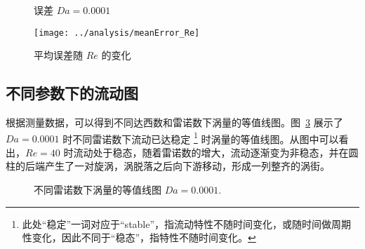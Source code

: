 \begin{figure}
	\centering
	\begin{minipage}{\textwidth}
		\centering
	\end{minipage}
	\centering
	\begin{minipage}{\textwidth}
		\centering
	\end{minipage}
	\caption{误差 $Da=0.0001$}
	\label{fig: resd}
\end{figure}

\begin{figure}
	\centering
	\texttt{[image: ../analysis/meanError\_Re]}
	\caption{平均误差随 $Re$ 的变化}
	\label{fig: error}
\end{figure}

\subsection{不同参数下的流动图}

根据测量数据，可以得到不同达西数和雷诺数下涡量的等值线图。图~\ref{fig: vorticity contour} 展示了 $Da=0.0001$ 时不同雷诺数下流动已达稳定 \footnote{此处“稳定”一词对应于“stable”，指流动特性不随时间变化，或随时间做周期性变化，因此不同于“稳态”，指特性不随时间变化。} 时涡量的等值线图。从图中可以看出，$Re=40$ 时流动处于稳态，随着雷诺数的增大，流动逐渐变为非稳态，并在圆柱的后端产生了一对旋涡，涡脱落之后向下游移动，形成一列整齐的涡街。


\begin{figure}
	\centering
	\begin{minipage}{\textwidth}
		\centering
	\end{minipage}
	\centering
	\begin{minipage}{\textwidth}
		\centering
	\end{minipage}
	\centering
	\begin{minipage}{\textwidth}
		\centering
	\end{minipage}
	\caption{不同雷诺数下涡量的等值线图 $Da=0.0001$.}
	\label{fig: vorticity contour}
\end{figure}


